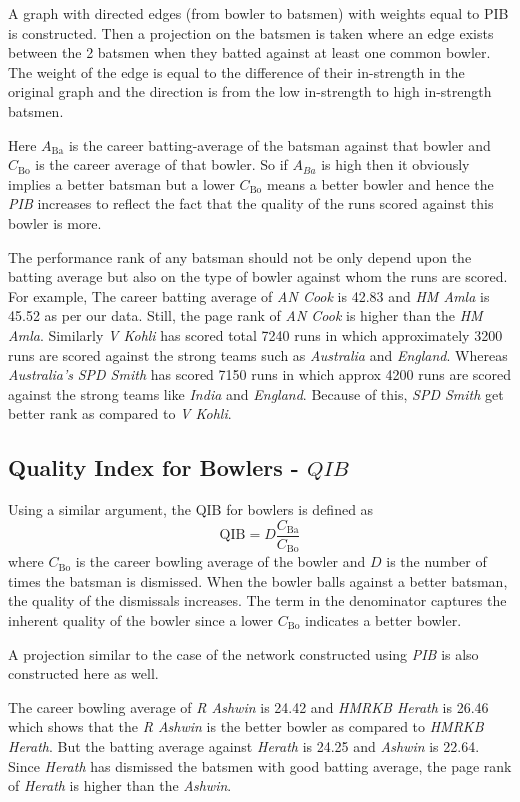 \documentclass{article}
\begin{document}
A graph with directed edges (from bowler to batsmen) with weights equal to PIB is constructed. Then a projection on the batsmen is taken where an edge exists between the 2 batsmen when they batted against at least one common bowler. The weight of the edge is equal to the difference of their in-strength in the original graph and the direction is from the low in-strength to high in-strength batsmen.

Here $A_{\mathrm{Ba}}$ is the career batting-average of the batsman against that bowler and $C_{\mathrm{Bo}}$ is the career average of that bowler. So if $A_{Ba}$ is high then it obviously implies a better batsman but a lower $C_{\mathrm{Bo}}$ means a better bowler and hence the \textit{PIB} increases to reflect the fact that the quality of the runs scored against this bowler is more.

The performance rank of any batsman should not be only depend upon the batting average but also on the type of bowler against whom the runs are scored. For example, The career batting average of \textit{AN Cook} is 42.83 and \textit{HM Amla} is 45.52 as per our data. Still, the page rank of \textit{AN Cook} is higher than the \textit{HM Amla}. Similarly \textit{V Kohli} has scored total 7240 runs in which approximately 3200 runs are scored against the strong teams such as \textit{Australia} and \textit{England}. Whereas \textit{Australia's} \textit{SPD Smith} has scored 7150 runs in which approx 4200 runs are scored against the strong teams like \textit{India} and \textit{England}. Because of this, \textit{SPD Smith} get better rank as compared to \textit{V Kohli}. 

\subsection{Quality Index for Bowlers - $QIB$}
Using a similar argument, the QIB for bowlers is defined as $$\mathrm{QIB} = D\frac{C_{\mathrm{Ba}}}{C_{\mathrm{Bo}}}$$ where $C_{\mathrm{Bo}}$ is the career bowling average of the bowler and $D$ is the number of times the batsman is dismissed. When the bowler balls against a better batsman, the quality of the dismissals increases. The term in the denominator captures the inherent quality of the bowler since a lower $C_{\mathrm{Bo}}$ indicates a better bowler.

A projection similar to the case of the network constructed using \textit{PIB} is also constructed here as well.

The career bowling average of \textit{R Ashwin} is 24.42 and \textit{HMRKB Herath} is 26.46 which shows that the \textit{R Ashwin} is the better bowler as compared to \textit{HMRKB Herath}. But the batting average against \textit{Herath} is 24.25 and \textit{Ashwin} is 22.64. Since \textit{Herath} has dismissed the batsmen with good batting average, the page rank of \textit{Herath} is higher than the \textit{Ashwin}. 
\end{document}
